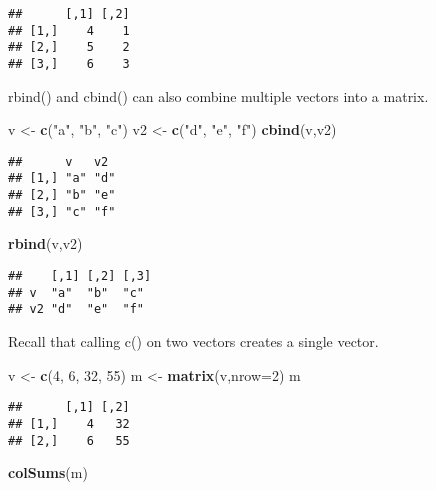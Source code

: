 \documentclass[
]{article}
\newenvironment{Shaded}{\begin{snugshade}}{\end{snugshade}}
\newcommand{\DataTypeTok}[1]{\textcolor[rgb]{0.13,0.29,0.53}{#1}}
\newcommand{\DecValTok}[1]{\textcolor[rgb]{0.00,0.00,0.81}{#1}}
\newcommand{\KeywordTok}[1]{\textcolor[rgb]{0.13,0.29,0.53}{\textbf{#1}}}
\newcommand{\NormalTok}[1]{#1}
\newcommand{\StringTok}[1]{\textcolor[rgb]{0.31,0.60,0.02}{#1}}
\begin{document}
\begin{verbatim}
##      [,1] [,2]
## [1,]    4    1
## [2,]    5    2
## [3,]    6    3
\end{verbatim}

rbind() and cbind() can also combine multiple vectors into a matrix.

\begin{Shaded}
\begin{Highlighting}[]
\NormalTok{v <-}\StringTok{ }\KeywordTok{c}\NormalTok{(}\StringTok{"a"}\NormalTok{, }\StringTok{"b"}\NormalTok{, }\StringTok{"c"}\NormalTok{)}
\NormalTok{v2 <-}\StringTok{ }\KeywordTok{c}\NormalTok{(}\StringTok{"d"}\NormalTok{, }\StringTok{"e"}\NormalTok{, }\StringTok{"f"}\NormalTok{)}
\KeywordTok{cbind}\NormalTok{(v,v2)}
\end{Highlighting}
\end{Shaded}

\begin{verbatim}
##      v   v2 
## [1,] "a" "d"
## [2,] "b" "e"
## [3,] "c" "f"
\end{verbatim}

\begin{Shaded}
\begin{Highlighting}[]
\KeywordTok{rbind}\NormalTok{(v,v2)}
\end{Highlighting}
\end{Shaded}

\begin{verbatim}
##    [,1] [,2] [,3]
## v  "a"  "b"  "c" 
## v2 "d"  "e"  "f"
\end{verbatim}

Recall that calling c() on two vectors creates a single vector.

\begin{Shaded}
\begin{Highlighting}[]
\NormalTok{v <-}\StringTok{ }\KeywordTok{c}\NormalTok{(}\DecValTok{4}\NormalTok{, }\DecValTok{6}\NormalTok{, }\DecValTok{32}\NormalTok{, }\DecValTok{55}\NormalTok{)}
\NormalTok{m <-}\StringTok{ }\KeywordTok{matrix}\NormalTok{(v,}\DataTypeTok{nrow=}\DecValTok{2}\NormalTok{)}
\NormalTok{m}
\end{Highlighting}
\end{Shaded}

\begin{verbatim}
##      [,1] [,2]
## [1,]    4   32
## [2,]    6   55
\end{verbatim}

\begin{Shaded}
\begin{Highlighting}[]
\KeywordTok{colSums}\NormalTok{(m)}
\end{Highlighting}
\end{Shaded}
\end{document}
